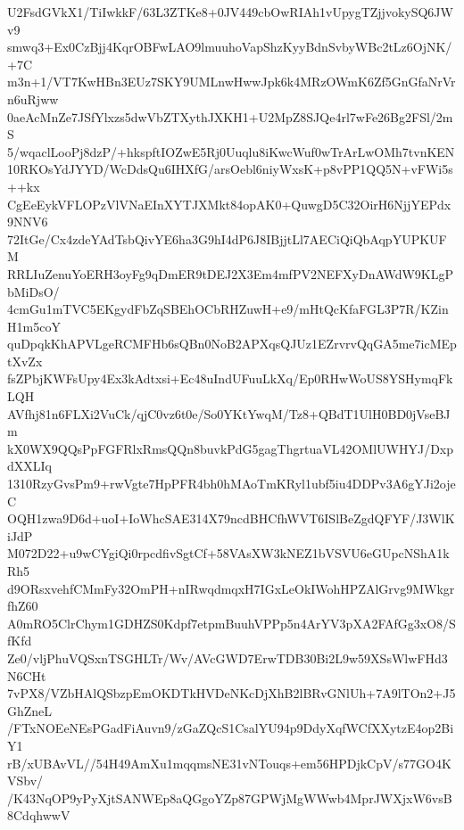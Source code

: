 U2FsdGVkX1/TiIwkkF/63L3ZTKe8+0JV449cbOwRIAh1vUpygTZjjvokySQ6JWv9
smwq3+Ex0CzBjj4KqrOBFwLAO9lmuuhoVapShzKyyBdnSvbyWBc2tLz6OjNK/+7C
m3n+1/VT7KwHBn3EUz7SKY9UMLnwHwwJpk6k4MRzOWmK6Zf5GnGfaNrVrn6uRjww
0aeAcMnZe7JSfYlxzs5dwVbZTXythJXKH1+U2MpZ8SJQe4rl7wFe26Bg2FSl/2mS
5/wqaclLooPj8dzP/+hkspftIOZwE5Rj0Uuqlu8iKwcWuf0wTrArLwOMh7tvnKEN
10RKOsYdJYYD/WcDdsQu6IHXfG/arsOebl6niyWxsK+p8vPP1QQ5N+vFWi5s++kx
CgEeEykVFLOPzVlVNaEInXYTJXMkt84opAK0+QuwgD5C32OirH6NjjYEPdx9NNV6
72ItGe/Cx4zdeYAdTsbQivYE6ha3G9hI4dP6J8IBjjtLl7AECiQiQbAqpYUPKUFM
RRLIuZenuYoERH3oyFg9qDmER9tDEJ2X3Em4mfPV2NEFXyDnAWdW9KLgPbMiDsO/
4cmGu1mTVC5EKgydFbZqSBEhOCbRHZuwH+e9/mHtQcKfaFGL3P7R/KZinH1m5coY
quDpqkKhAPVLgeRCMFHb6sQBn0NoB2APXqsQJUz1EZrvrvQqGA5me7icMEptXvZx
fsZPbjKWFsUpy4Ex3kAdtxsi+Ec48uIndUFuuLkXq/Ep0RHwWoUS8YSHymqFkLQH
AVfhj81n6FLXi2VuCk/qjC0vz6t0e/So0YKtYwqM/Tz8+QBdT1UlH0BD0jVseBJm
kX0WX9QQsPpFGFRlxRmsQQn8buvkPdG5gagThgrtuaVL42OMlUWHYJ/DxpdXXLIq
1310RzyGvsPm9+rwVgte7HpPFR4bh0hMAoTmKRyl1ubf5iu4DDPv3A6gYJi2ojeC
OQH1zwa9D6d+uoI+IoWhcSAE314X79ncdBHCfhWVT6ISlBeZgdQFYF/J3WlKiJdP
M072D22+u9wCYgiQi0rpcdfivSgtCf+58VAsXW3kNEZ1bVSVU6eGUpcNShA1kRh5
d9ORsxvehfCMmFy32OmPH+nIRwqdmqxH7IGxLeOkIWohHPZAlGrvg9MWkgrfhZ60
A0mRO5ClrChym1GDHZS0Kdpf7etpmBuuhVPPp5n4ArYV3pXA2FAfGg3xO8/SfKfd
Ze0/vljPhuVQSxnTSGHLTr/Wv/AVcGWD7ErwTDB30Bi2L9w59XSsWlwFHd3N6CHt
7vPX8/VZbHAlQSbzpEmOKDTkHVDeNKcDjXhB2lBRvGNlUh+7A9lTOn2+J5GhZneL
/FTxNOEeNEsPGadFiAuvn9/zGaZQcS1CsalYU94p9DdyXqfWCfXXytzE4op2BiY1
rB/xUBAvVL//54H49AmXu1mqqmsNE31vNTouqs+em56HPDjkCpV/s77GO4KVSbv/
/K43NqOP9yPyXjtSANWEp8aQGgoYZp87GPWjMgWWwb4MprJWXjxW6vsB8CdqhwwV
